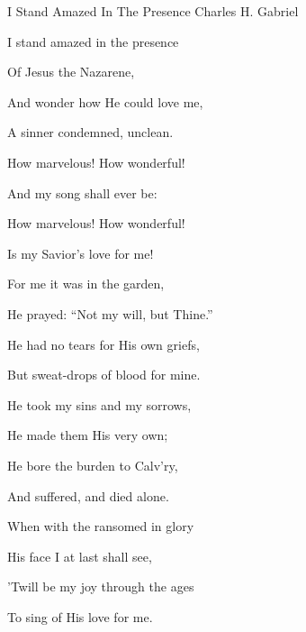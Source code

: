\documentclass[12pt]{book}
\begin{document}
\begin{song}{I Stand Amazed In The Presence}{}
  {\SBPubDom}
  {Charles H. Gabriel}
  {}
  {}

  \begin{SBVerse}
    I stand amazed in the presence

    Of Jesus the Nazarene,

    And wonder how He could love me,

    A sinner condemned, unclean.
  \end{SBVerse}

  \begin{SBOpGroup}
    How marvelous! How wonderful!

    And my song shall ever be:

    How marvelous! How wonderful!

    Is my Savior's love for me!
  \end{SBOpGroup}

  \begin{SBVerse}
    For me it was in the garden,

    He prayed: ``Not my will, but Thine.''

    He had no tears for His own griefs,

    But sweat-drops of blood for mine.
  \end{SBVerse}

  \begin{SBVerse}
    He took my sins and my sorrows,

    He made them His very own;

    He bore the burden to Calv'ry,

    And suffered, and died alone.
  \end{SBVerse}

  \begin{SBVerse}
    When with the ransomed in glory

    His face I at last shall see,

    'Twill be my joy through the ages

    To sing of His love for me.
  \end{SBVerse}
\end{song}
\end{document}
